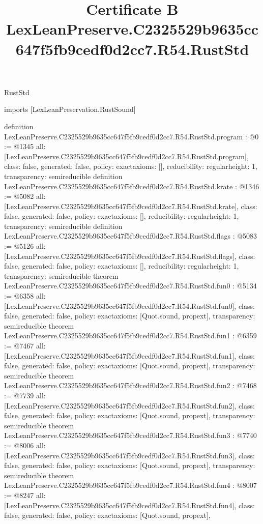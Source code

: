 \begin{lexlean}{RustStd}
\title{Certificate B LexLeanPreserve.C2325529b9635cc647f5fb9cedf0d2cc7.R54.RustStd}
\begin{coremodule}
imports [LexLeanPreservation.RustSound]

definition LexLeanPreserve.C2325529b9635cc647f5fb9cedf0d2cc7.R54.RustStd.program : @0 := @1345 {
  all: [LexLeanPreserve.C2325529b9635cc647f5fb9cedf0d2cc7.R54.RustStd.program],
  class: false,
  generated: false,
  policy: exact{axioms: []},
  reducibility: regular{height: 1},
  transparency: semireducible
}
definition LexLeanPreserve.C2325529b9635cc647f5fb9cedf0d2cc7.R54.RustStd.krate : @1346 := @5082 {
  all: [LexLeanPreserve.C2325529b9635cc647f5fb9cedf0d2cc7.R54.RustStd.krate],
  class: false,
  generated: false,
  policy: exact{axioms: []},
  reducibility: regular{height: 1},
  transparency: semireducible
}
definition LexLeanPreserve.C2325529b9635cc647f5fb9cedf0d2cc7.R54.RustStd.flags : @5083 := @5126 {
  all: [LexLeanPreserve.C2325529b9635cc647f5fb9cedf0d2cc7.R54.RustStd.flags],
  class: false,
  generated: false,
  policy: exact{axioms: []},
  reducibility: regular{height: 1},
  transparency: semireducible
}
theorem LexLeanPreserve.C2325529b9635cc647f5fb9cedf0d2cc7.R54.RustStd.fun0 : @5134 := @6358 {
  all: [LexLeanPreserve.C2325529b9635cc647f5fb9cedf0d2cc7.R54.RustStd.fun0],
  class: false,
  generated: false,
  policy: exact{axioms: [Quot.sound, propext]},
  transparency: semireducible
}
theorem LexLeanPreserve.C2325529b9635cc647f5fb9cedf0d2cc7.R54.RustStd.fun1 : @6359 := @7467 {
  all: [LexLeanPreserve.C2325529b9635cc647f5fb9cedf0d2cc7.R54.RustStd.fun1],
  class: false,
  generated: false,
  policy: exact{axioms: [Quot.sound, propext]},
  transparency: semireducible
}
theorem LexLeanPreserve.C2325529b9635cc647f5fb9cedf0d2cc7.R54.RustStd.fun2 : @7468 := @7739 {
  all: [LexLeanPreserve.C2325529b9635cc647f5fb9cedf0d2cc7.R54.RustStd.fun2],
  class: false,
  generated: false,
  policy: exact{axioms: [Quot.sound, propext]},
  transparency: semireducible
}
theorem LexLeanPreserve.C2325529b9635cc647f5fb9cedf0d2cc7.R54.RustStd.fun3 : @7740 := @8006 {
  all: [LexLeanPreserve.C2325529b9635cc647f5fb9cedf0d2cc7.R54.RustStd.fun3],
  class: false,
  generated: false,
  policy: exact{axioms: [Quot.sound, propext]},
  transparency: semireducible
}
theorem LexLeanPreserve.C2325529b9635cc647f5fb9cedf0d2cc7.R54.RustStd.fun4 : @8007 := @8247 {
  all: [LexLeanPreserve.C2325529b9635cc647f5fb9cedf0d2cc7.R54.RustStd.fun4],
  class: false,
  generated: false,
  policy: exact{axioms: [Quot.sound, propext]},
}
\end{coremodule}
\end{lexlean}
